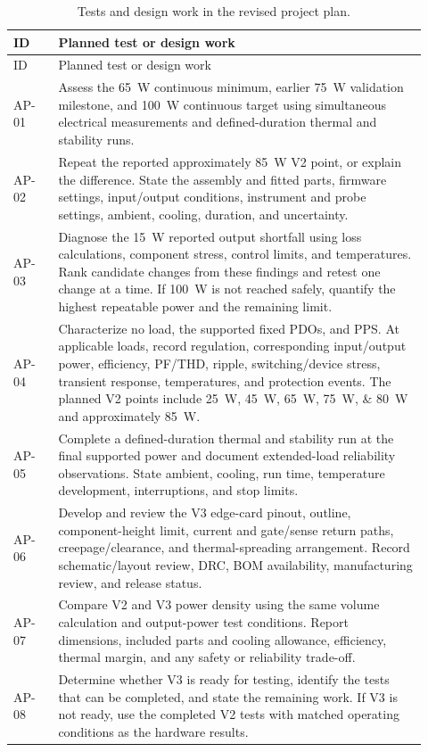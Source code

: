 \begingroup
\small
\begin{longtable}{@{}L{0.10\linewidth}L{0.82\linewidth}@{}}
\caption[Tests and design work in the revised plan.]{Tests and design work in the revised project plan.}
\label{tab:req-revised-plan-criteria}\\
\toprule ID & Planned test or design work\\\midrule
\endfirsthead
\toprule ID & Planned test or design work\\\midrule
\endhead
AP-01 & Assess the \SI{65}{\watt} continuous minimum, earlier \SI{75}{\watt} validation milestone, and \SI{100}{\watt} continuous target using simultaneous electrical measurements and defined-duration thermal and stability runs.\\
AP-02 & Repeat the reported approximately \SI{85}{\watt} V2 point, or explain the difference. State the assembly and fitted parts, firmware settings, input/output conditions, instrument and probe settings, ambient, cooling, duration, and uncertainty.\\
AP-03 & Diagnose the \SI{15}{\watt} reported output shortfall using loss calculations, component stress, control limits, and temperatures. Rank candidate changes from these findings and retest one change at a time. If \SI{100}{\watt} is not reached safely, quantify the highest repeatable power and the remaining limit.\\
AP-04 & Characterize no load, the supported fixed PDOs, and PPS. At applicable loads, record regulation, corresponding input/output power, efficiency, PF/THD, ripple, switching/device stress, transient response, temperatures, and protection events. The planned V2 points include \SIlist{25;45;65;75;80}{\watt} and approximately \SI{85}{\watt}.\\
AP-05 & Complete a defined-duration thermal and stability run at the final supported power and document extended-load reliability observations. State ambient, cooling, run time, temperature development, interruptions, and stop limits.\\
AP-06 & Develop and review the V3 edge-card pinout, outline, component-height limit, current and gate/sense return paths, creepage/clearance, and thermal-spreading arrangement. Record schematic/layout review, DRC, BOM availability, manufacturing review, and release status.\\
AP-07 & Compare V2 and V3 power density using the same volume calculation and output-power test conditions. Report dimensions, included parts and cooling allowance, efficiency, thermal margin, and any safety or reliability trade-off.\\
AP-08 & Determine whether V3 is ready for testing, identify the tests that can be completed, and state the remaining work. If V3 is not ready, use the completed V2 tests with matched operating conditions as the hardware results.\\
\bottomrule
\end{longtable}
\endgroup

